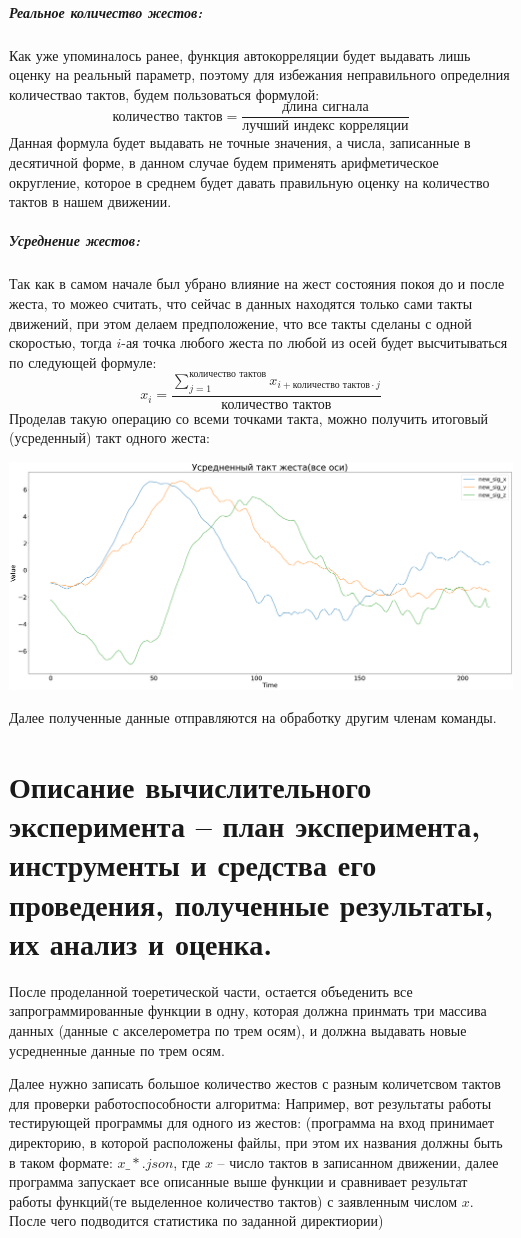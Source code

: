 \documentclass[a4paper]{article}
\begin{document}
\subparagraph*{Реальное количество жестов:}
Как уже упоминалось ранее, функция автокорреляции будет выдавать лишь оценку на реальный параметр, поэтому для избежания неправильного определния количествао тактов, будем пользоваться формулой:
\[\text{количество тактов} = \dfrac{\text{длина сигнала}}{\text{лучший индекс корреляции}}\]
Данная формула будет выдавать не точные значения, а числа, записанные в десятичной форме, в данном случае будем применять арифметическое округление, которое в среднем будет давать правильную оценку на количество тактов в нашем движении.
\subparagraph*{Усреднение жестов:}
Так как в самом начале был убрано влияние на жест состояния покоя до и после жеста, то можео считать, что сейчас в данных находятся только сами такты движений, при этом делаем предположение, что все такты сделаны с одной скоростью, тогда $i$-ая точка любого жеста по любой из осей будет высчитываться по следующей формуле:
\[x_i = \dfrac{\sum_{j = 1}^{\text{количество тактов}} x_{i + \text{количество тактов} \cdot j}}{\text{количество тактов}}\]
Проделав такую операцию со всеми точками такта, можно получить итоговый (усреденный) такт одного жеста:

\includegraphics[scale = 0.17]{avr_gesture.png}

Далее полученные данные отправляются на обработку другим членам команды.


\section{Описание вычислительного эксперимента – план эксперимента, инструменты и средства его проведения, полученные результаты, их анализ и оценка.}
После проделанной тоеретической части, остается объеденить все запрограммированные функции в одну, которая должна принмать три массива данных (данные с акселерометра по трем осям), и должна выдавать новые усредненные данные по трем осям.

Далее нужно записать большое количество жестов с разным количетсвом тактов для проверки работоспособности алгоритма:
Например, вот результаты работы тестирующей программы для одного из жестов:
(программа на вход принимает директорию, в которой расположены файлы, при этом их названия должны быть в таком формате: $x\_*.json$, где $x$ -- число тактов в записанном движении, далее программа запускает все описанные выше функции и сравнивает результат работы функций(те выделенное количество тактов) с заявленным числом $x$. После чего подводится статистика по заданной директиории)
\end{document}
